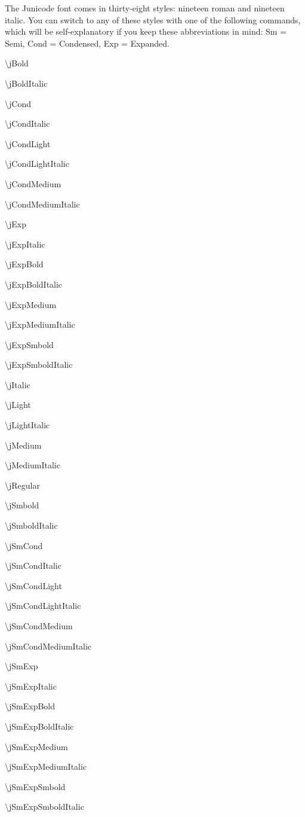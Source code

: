 \documentclass{article}
\begin{document}
The Junicode font comes in thirty-eight styles: nineteen roman and nineteen italic. You can
switch to any of these styles with one of the following commands, which will be self-explanatory
if you keep these abbreviations in mind: Sm = Semi, Cond = Condensed, Exp = Expanded.

\begin{multicols}{3}
    \jCond\textbackslash jBold

    \textbackslash jBoldItalic
    
    \textbackslash jCond
    
    \textbackslash jCondItalic
    
    \textbackslash jCondLight
    
    \textbackslash jCondLightItalic
    
    \textbackslash jCondMedium
    
    \textbackslash jCondMediumItalic
    
    \textbackslash jExp
    
    \textbackslash jExpItalic
    
    \textbackslash jExpBold
    
    \textbackslash jExpBoldItalic
    
    \textbackslash jExpMedium
    
    \textbackslash jExpMediumItalic
    
    \textbackslash jExpSmbold
    
    \textbackslash jExpSmboldItalic
    
    \textbackslash jItalic
    
    \textbackslash jLight
    
    \textbackslash jLightItalic
    
    \textbackslash jMedium
    
    \textbackslash jMediumItalic
    
    \textbackslash jRegular
    
    \textbackslash jSmbold
    
    \textbackslash jSmboldItalic
    
    \textbackslash jSmCond
    
    \textbackslash jSmCondItalic
    
    \textbackslash jSmCondLight
    
    \textbackslash jSmCondLightItalic
    
    \textbackslash jSmCondMedium
    
    \textbackslash jSmCondMediumItalic
    
    \textbackslash jSmExp
    
    \textbackslash jSmExpItalic
    
    \textbackslash jSmExpBold
    
    \textbackslash jSmExpBoldItalic
    
    \textbackslash jSmExpMedium
    
    \textbackslash jSmExpMediumItalic
    
    \textbackslash jSmExpSmbold
    
    \textbackslash jSmExpSmboldItalic    
\end{multicols}
\end{document}
